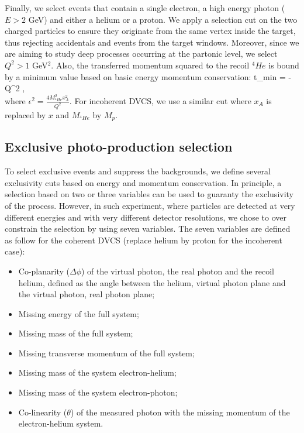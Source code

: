 \documentclass{article}
\let\oldequation\equation
\let\oldendequation\endequation
\renewenvironment{equation}
  {\linenomathNonumbers\oldequation}
  {\oldendequation\endlinenomath}
\begin{document}
Finally, we select events that contain a single electron, a high energy photon ($E>2$ GeV) and
either a helium or a proton. We apply a selection cut on the two charged particles 
to ensure they originate from the same vertex inside the target, thus rejecting accidentals and
events from the target windows.
Moreover, since we are aiming to study deep processes occurring at the partonic level, we select
$Q^2>1$ GeV$^2$. Also, the transferred momentum squared to the recoil $^{4}He$ is bound by
   a minimum value based on basic energy momentum conservation:
\begin{equation}
   t_{min} = - Q^{2} ,\\
\end{equation}
where $\epsilon ^{2} = \frac{4M^{2}_{^4\!He}x^{2}_{A}}{Q^{2}}$. For incoherent DVCS, 
we use a similar cut where $x_A$ is replaced by $x$ and $M_{^4\!He}$ by $M_{p}$. 

\subsection{Exclusive photo-production selection}

To select exclusive events and suppress the backgrounds, we define several 
exclusivity cuts based on energy and momentum conservation. In principle, 
a selection based on two or three variables can be used to guaranty the 
exclusivity of the process. However, in such experiment, where particles 
are detected at very different energies and with very different detector 
resolutions, we chose to over constrain the selection by using seven 
variables. The seven variables are defined as follow for the coherent 
DVCS (replace helium by proton for the incoherent case):
\begin{itemize}
	\item Co-planarity ($\Delta \phi$) of the virtual photon, the real photon and
		the recoil helium, defined as the angle between the helium, virtual photon
		plane and the virtual photon, real photon plane;
	\item Missing energy of the full system;
	\item Missing mass of the full system;
	\item Missing transverse momentum of the full system;
	\item Missing mass of the system electron-helium;
	\item Missing mass of the system electron-photon;
	\item Co-linearity ($\theta$) of the measured photon with the missing momentum of the 
		electron-helium system.
\end{itemize}
\end{document}
